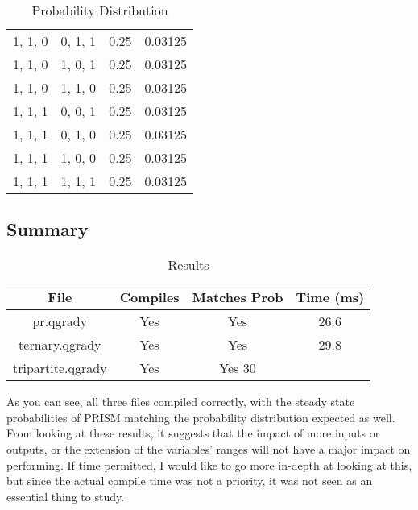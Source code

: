 \documentclass[report.tex]{subfiles}
\begin{document}
\begin{table}[H]
\begin{tabular}{c | c | c | c}
    1, 1, 0 & 0, 1, 1 & 0.25 & 0.03125 \\
    1, 1, 0 & 1, 0, 1 & 0.25 & 0.03125 \\
    1, 1, 0 & 1, 1, 0 & 0.25 & 0.03125 \\
    1, 1, 1 & 0, 0, 1 & 0.25 & 0.03125 \\
    1, 1, 1 & 0, 1, 0 & 0.25 & 0.03125 \\
    1, 1, 1 & 1, 0, 0 & 0.25 & 0.03125 \\
    1, 1, 1 & 1, 1, 1 & 0.25 & 0.03125 \\
  \end{tabular}
  \caption{Probability Distribution}
  \label{tab:threeinputs_qgrady}
\end{table}

\subsection{Summary} %
\label{sub:prism_summary}
\begin{table}[H]
  \centering
  \begin{tabular}{c | c | c | c}
    File & Compiles & Matches Prob & Time (ms)\\
    \hline
    pr.qgrady & Yes & Yes & 26.6 \\
    ternary.qgrady & Yes & Yes & 29.8 \\
    tripartite.qgrady & Yes & Yes 30\\
  \end{tabular}
  \caption{Results}
  \label{tab:prism_results}
\end{table}

As you can see, all three files compiled correctly, with the steady state 
probabilities of PRISM matching the probability distribution expected as well.
From looking at these results, it suggests that the impact of more inputs or
outputs, or the extension of the variables' ranges will not have a major
impact on performing. If time permitted, I would like to go more in-depth at
looking at this, but since the actual compile time was not a priority, it was
not seen as an essential thing to study.
\newpage
\end{document}
